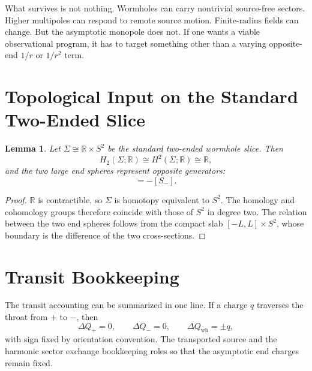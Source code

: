 \documentclass[aps,prd,onecolumn,nofootinbib,superscriptaddress]{revtex4-2}
\newtheorem{lemma}{Lemma}
\begin{document}
What survives is not nothing. Wormholes can carry nontrivial source-free sectors. Higher multipoles can respond to remote source motion. Finite-radius fields can change. But the asymptotic monopole does not. If one wants a viable observational program, it has to target something other than a varying opposite-end $1/r$ or $1/r^2$ term.

\appendix

\section{Topological Input on the Standard Two-Ended Slice}
\label{app:topology}

\begin{lemma}
Let $\Sigma \cong \mathbb{R}\times S^2$ be the standard two-ended wormhole slice. Then
\begin{equation}
H_2(\Sigma;\mathbb{R}) \cong H^2(\Sigma;\mathbb{R}) \cong \mathbb{R},
\end{equation}
and the two large end spheres represent opposite generators:
\begin{equation}
[S_+] = -[S_-].
\end{equation}
\end{lemma}

\begin{proof}
$\mathbb{R}$ is contractible, so $\Sigma$ is homotopy equivalent to $S^2$. The homology and cohomology groups therefore coincide with those of $S^2$ in degree two. The relation between the two end spheres follows from the compact slab $[-L,L]\times S^2$, whose boundary is the difference of the two cross-sections.
\end{proof}

\section{Transit Bookkeeping}
\label{app:transit}

The transit accounting can be summarized in one line. If a charge $q$ traverses the throat from $+$ to $-$, then
\begin{equation}
\Delta Q_+ = 0,
\qquad
\Delta Q_- = 0,
\qquad
\Delta Q_{\mathrm{wh}} = \pm q,
\end{equation}
with sign fixed by orientation convention. The transported source and the harmonic sector exchange bookkeeping roles so that the asymptotic end charges remain fixed.



\end{document}
